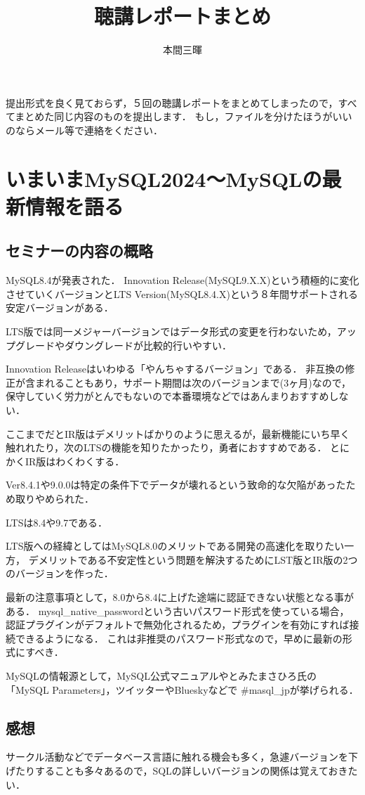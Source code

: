 \documentclass[titlepage,a4paper]{jsarticle}
\title{聴講レポートまとめ}
\author{本間三暉}
\begin{document}
\maketitle
提出形式を良く見ておらず，５回の聴講レポートをまとめてしまったので，すべてまとめた同じ内容のものを提出します．
もし，ファイルを分けたほうがいいのならメール等で連絡をください．
\section{いまいまMySQL2024〜MySQLの最新情報を語る} %
\subsection{セミナーの内容の概略}
MySQL8.4が発表された．
Innovation Release(MySQL9.X.X)という積極的に変化させていくバージョンとLTS Version(MySQL8.4.X)という８年間サポートされる安定バージョンがある．

LTS版では同一メジャーバージョンではデータ形式の変更を行わないため，アップグレードやダウングレードが比較的行いやすい．

Innovation Releaseはいわゆる「やんちゃするバージョン」である．
非互換の修正が含まれることもあり，サポート期間は次のバージョンまで(3ヶ月)なので，保守していく労力がとんでもないので本番環境などではあんまりおすすめしない．

ここまでだとIR版はデメリットばかりのように思えるが，最新機能にいち早く触れれたり，次のLTSの機能を知りたかったり，勇者におすすめである．
とにかくIR版はわくわくする．

Ver8.4.1や9.0.0は特定の条件下でデータが壊れるという致命的な欠陥があったため取りやめられた．

LTSは8.4や9.7である．

LTS版への経緯としてはMySQL8.0のメリットである開発の高速化を取りたい一方，
デメリットである不安定性という問題を解決するためにLST版とIR版の2つのバージョンを作った．

最新の注意事項として，8.0から8.4に上げた途端に認証できない状態となる事がある．
mysql\_native\_passwordという古いパスワード形式を使っている場合，
認証プラグインがデフォルトで無効化されるため，プラグインを有効にすれば接続できるようになる．
これは非推奨のパスワード形式なので，早めに最新の形式にすべき．

MySQLの情報源として，MySQL公式マニュアルやとみたまさひろ氏の「MySQL Parameters」，ツイッターやBlueskyなどで \#masql\_jpが挙げられる．
\subsection{感想}
サークル活動などでデータベース言語に触れる機会も多く，急遽バージョンを下げたりすることも多々あるので，SQLの詳しいバージョンの関係は覚えておきたい．
\end{document}
